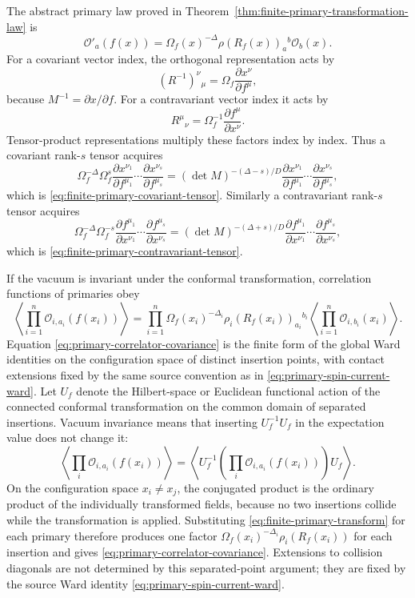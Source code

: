 The abstract primary law proved in
Theorem~\ref{thm:finite-primary-transformation-law} is
\[
  \mathcal O'_a(f(x))
  =
  \Omega_f(x)^{-\Delta}\rho(R_f(x))_a{}^b\mathcal O_b(x).
\]
For a covariant vector index, the orthogonal representation acts by
\[
  (R^{-1})^\nu{}_\mu
  =
  \Omega_f\frac{\partial x^\nu}{\partial f^\mu},
\]
because \(M^{-1}=\partial x/\partial f\).  For a contravariant vector index it
acts by
\[
  R^\mu{}_\nu
  =
  \Omega_f^{-1}\frac{\partial f^\mu}{\partial x^\nu}.
\]
Tensor-product representations multiply these factors index by index.  Thus a
covariant rank-\(s\) tensor acquires
\[
  \Omega_f^{-\Delta}\Omega_f^s
  \frac{\partial x^{\nu_1}}{\partial f^{\mu_1}}\cdots
  \frac{\partial x^{\nu_s}}{\partial f^{\mu_s}}
  =
  (\det M)^{-(\Delta-s)/D}
  \frac{\partial x^{\nu_1}}{\partial f^{\mu_1}}\cdots
  \frac{\partial x^{\nu_s}}{\partial f^{\mu_s}},
\]
which is \eqref{eq:finite-primary-covariant-tensor}.  Similarly a
contravariant rank-\(s\) tensor acquires
\[
  \Omega_f^{-\Delta}\Omega_f^{-s}
  \frac{\partial f^{\mu_1}}{\partial x^{\nu_1}}\cdots
  \frac{\partial f^{\mu_s}}{\partial x^{\nu_s}}
  =
  (\det M)^{-(\Delta+s)/D}
  \frac{\partial f^{\mu_1}}{\partial x^{\nu_1}}\cdots
  \frac{\partial f^{\mu_s}}{\partial x^{\nu_s}},
\]
which is \eqref{eq:finite-primary-contravariant-tensor}.

\begin{remark}
\label{rem:primary-correlator-finite-covariance}
If the vacuum is invariant under the conformal transformation, correlation
functions of primaries obey
\begin{equation}
  \left\langle
    \prod_{i=1}^n\mathcal O_{i,a_i}(f(x_i))
  \right\rangle
  =
  \prod_{i=1}^n
  \Omega_f(x_i)^{-\Delta_i}
  \rho_i(R_f(x_i))_{a_i}{}^{b_i}
  \left\langle
    \prod_{i=1}^n\mathcal O_{i,b_i}(x_i)
  \right\rangle .
  \label{eq:primary-correlator-covariance}
\end{equation}
Equation \eqref{eq:primary-correlator-covariance} is the finite form of the
global Ward identities on the configuration space of distinct insertion
points, with contact extensions fixed by the same source convention as in
\eqref{eq:primary-spin-current-ward}.
Let \(U_f\) denote the Hilbert-space or Euclidean functional action of the
connected conformal transformation on the common domain of separated
insertions.  Vacuum invariance means that inserting
\(U_f^{-1}U_f\) in the expectation value does not change it:
\[
  \left\langle\prod_i\mathcal O_{i,a_i}(f(x_i))\right\rangle
  =
  \left\langle
  U_f^{-1}\left(\prod_i\mathcal O_{i,a_i}(f(x_i))\right)U_f
  \right\rangle .
\]
On the configuration space \(x_i\ne x_j\), the conjugated product is the
ordinary product of the individually transformed fields, because no two
insertions collide while the transformation is applied.  Substituting
\eqref{eq:finite-primary-transform} for each primary therefore produces one
factor \(\Omega_f(x_i)^{-\Delta_i}\rho_i(R_f(x_i))\) for each insertion and
gives \eqref{eq:primary-correlator-covariance}.  Extensions to collision
diagonals are not determined by this separated-point argument; they are fixed
by the source Ward identity \eqref{eq:primary-spin-current-ward}.
\end{remark}

